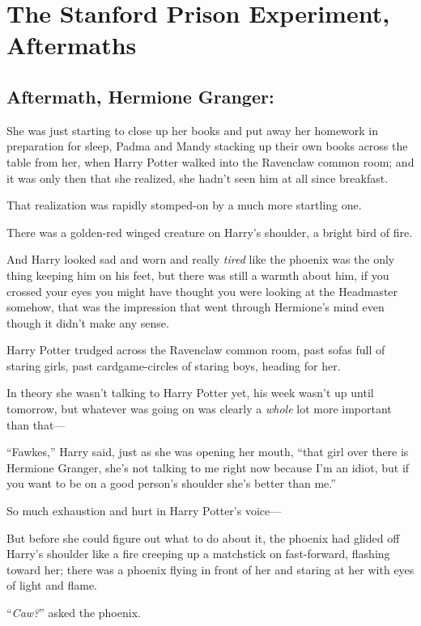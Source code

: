 \chapter{The Stanford Prison Experiment, Aftermaths}

\section{Aftermath, Hermione Granger:}

She was just starting to close up her books and put away her homework in preparation for sleep, Padma and Mandy stacking up their own books across the table from her, when Harry Potter walked into the Ravenclaw common room; and it was only then that she realized, she hadn’t seen him at all since breakfast.

That realization was rapidly stomped-on by a much more startling one.

There was a golden-red winged creature on Harry’s shoulder, a bright bird of fire.

And Harry looked sad and worn and really \emph{tired} like the phoenix was the only thing keeping him on his feet, but there was still a warmth about him, if you crossed your eyes you might have thought you were looking at the Headmaster somehow, that was the impression that went through Hermione’s mind even though it didn’t make any sense.

Harry Potter trudged across the Ravenclaw common room, past sofas full of staring girls, past cardgame-circles of staring boys, heading for her.

In theory she wasn’t talking to Harry Potter yet, his week wasn’t up until tomorrow, but whatever was going on was clearly a \emph{whole} lot more important than that—

“Fawkes,” Harry said, just as she was opening her mouth, “that girl over there is Hermione Granger, she’s not talking to me right now because I’m an idiot, but if you want to be on a good person’s shoulder she’s better than me.”

So much exhaustion and hurt in Harry Potter’s voice—

But before she could figure out what to do about it, the phoenix had glided off Harry’s shoulder like a fire creeping up a matchstick on fast-forward, flashing toward her; there was a phoenix flying in front of her and staring at her with eyes of light and flame.

“\emph{Caw?}” asked the phoenix.

